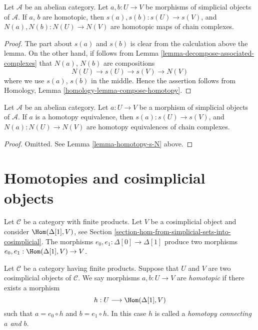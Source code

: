 \begin{lemma}
\label{lemma-homotopy-s-N}
Let $\mathcal{A}$ be an abelian category.
Let $a, b : U \to V$ be morphisms of simplicial
objects of $\mathcal{A}$. If $a$, $b$ are homotopic,
then $s(a), s(b) : s(U) \to s(V)$, and
$N(a), N(b) : N(U) \to N(V)$ are homotopic maps
of chain complexes.
\end{lemma}

\begin{proof}
The part about $s(a)$ and $s(b)$ is clear from the calculation
above the lemma. On the other hand, if follows from
Lemma \ref{lemma-decompose-associated-complexes} that
$N(a)$, $N(b)$ are compositions
$$
N(U) \to s(U) \to s(V) \to N(V)
$$
where we use $s(a)$, $s(b)$ in the middle. Hence the assertion
follows from
Homology, Lemma \ref{homology-lemma-compose-homotopy}.
\end{proof}

\begin{lemma}
\label{lemma-homotopy-equivalence-s-N}
Let $\mathcal{A}$ be an abelian category.
Let $a : U \to V$ be a morphism of simplicial
objects of $\mathcal{A}$. If $a$ is a homotopy equivalence,
then $s(a) : s(U) \to s(V)$, and
$N(a) : N(U) \to N(V)$ are homotopy equivalences of chain complexes.
\end{lemma}

\begin{proof}
Omitted. See Lemma \ref{lemma-homotopy-s-N} above.
\end{proof}




\section{Homotopies and cosimplicial objects}
\label{section-homotopy-cosimplicial}

\noindent
Let $\mathcal{C}$ be a category with finite products. Let $V$ be a
cosimplicial object and consider $\Hom(\Delta[1], V)$, see
Section \ref{section-hom-from-simplicial-sets-into-cosimplicial}.
The morphisms $e_0, e_1 : \Delta[0] \to \Delta[1]$
produce two morphisms $e_0, e_1 : \Hom(\Delta[1], V) \to V$.

\begin{definition}
\label{definition-homotopy-cosimplicial}
Let $\mathcal{C}$ be a category having finite products.
Suppose that $U$ and $V$ are two cosimplicial objects
of $\mathcal{C}$.
We say morphisms $a, b : U \to V$ are {\it homotopic}
if there exists a morphism
$$
h : U \longrightarrow \Hom(\Delta[1], V)
$$
such that $a = e_0 \circ h$ and $b = e_1 \circ h$.
In this case $h$ is called a {\it homotopy connecting
$a$ and $b$}.
\end{definition}

